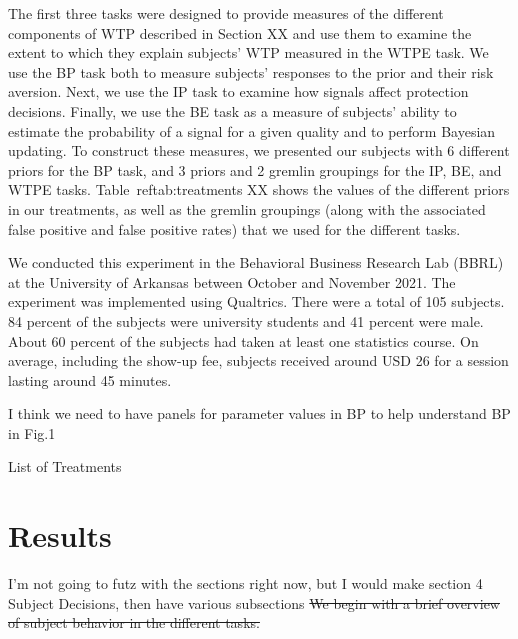 \documentclass[12pt,a4paper]{article}
\newcommand{\pmt}[1]{{\color{Blue}#1}}
\newcommand{\pmst}[1]{{\color{Blue}\sout{#1}}}
\begin{document}
The first three tasks were designed to provide measures of the different components of WTP described in Section XX and use them to examine the extent to which they explain subjects’ WTP measured in the WTPE task. We use the BP task both to measure subjects’ responses to the prior and their risk aversion. Next, we use the IP task to examine how signals affect protection decisions. Finally, we use the BE task as a measure of subjects’ ability to estimate the probability of a signal for a given quality and to perform Bayesian updating. To construct these measures, we presented our subjects with 6 different priors for the BP task, and 3 priors and 2 gremlin groupings for the IP, BE, and WTPE tasks. Table~ref{tab:treatments} XX shows the values of the different priors in our treatments, as well as the gremlin groupings (along with the associated false positive and false positive rates) that we used for the different tasks.

We conducted this experiment in the Behavioral Business Research Lab (BBRL) at the University of Arkansas between October and November 2021.  The experiment was implemented using Qualtrics. There were a total of 105 subjects. 84 percent of the subjects were university students and 41 percent were male.  About 60 percent of the subjects had taken at least one statistics course. On average, including the show-up fee, subjects received around USD 26 for a session lasting around 45 minutes.  



\pmt{I think we need to have panels for parameter values in BP to help understand BP in Fig.1}
\begin{table}[h!]
\caption{List of Treatments} \label{tab:treatments}

\end{table}







\vspace{20pt}
\section{Results}\label{sec:results}
\pmt{I'm not going to futz with the sections right now, but I would make section 4 Subject Decisions, then have various subsections}
\pmst{We begin with a brief overview of subject behavior in the different tasks. }
\end{document}
